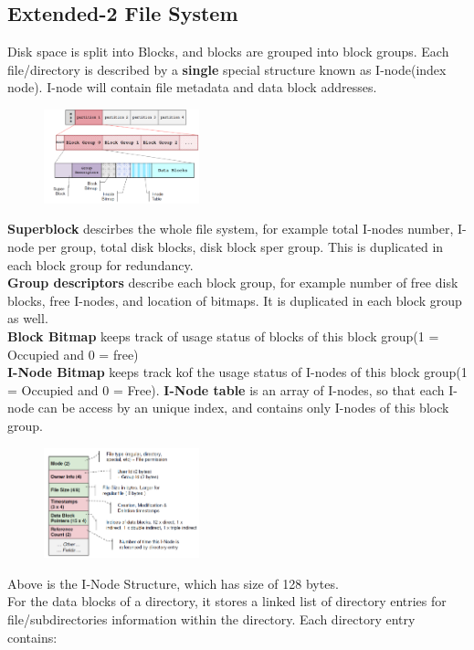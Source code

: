 \documentclass[12pt]{article}
\theoremstyle{definition}
\begin{document}
\subsection{Extended-2 File System}
Disk space is split into Blocks, and blocks are grouped into block groups. Each file/directory is described by a \textbf{single} special structure known as I-node(index node). I-node will contain file metadata and data block addresses.
\begin{figure}[h]
\centering
\includegraphics[width=0.4\textwidth]{12_4.png}
\end{figure}
\textbf{Superblock} descirbes the whole file system, for example total I-nodes number, I-node per group, total disk blocks, disk block sper group. This is duplicated in each block group for redundancy.\\
\textbf{Group descriptors} describe each block group, for example number of free disk blocks, free I-nodes, and location of bitmaps. It is duplicated in each block group as well.\\
\textbf{Block Bitmap} keeps track of usage status of blocks of this block group(1 = Occupied and 0 = free)\\
\textbf{I-Node Bitmap} keeps track kof the usage status of I-nodes of this block group(1 = Occupied and 0 = Free).
\textbf{I-Node table} is an array of I-nodes, so that each I-node can be access by an unique index, and contains only I-nodes of this block group.
\begin{figure}[h]
\centering
\includegraphics[width=0.4\textwidth]{12_3.png}
\end{figure}
Above is the I-Node Structure, which has size of 128 bytes.\\
For the data blocks of a directory, it stores a linked list of directory entries for file/subdirectories information within the directory. Each directory entry contains:
\end{document}

